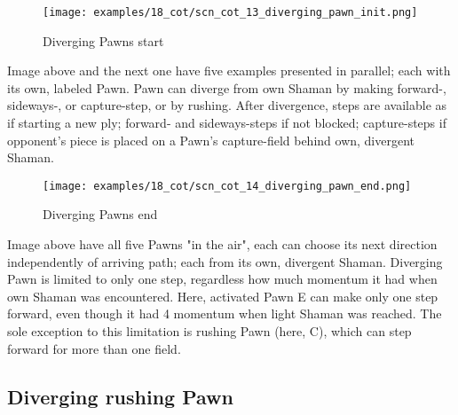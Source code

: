 \vspace*{-1.4\baselineskip}
\noindent
\begin{figure}[!h]
\texttt{[image: examples/18\_cot/scn\_cot\_13\_diverging\_pawn\_init.png]}
\vspace*{-1.3\baselineskip}
\caption{Diverging Pawns start}
\label{fig:scn_cot_13_diverging_pawn_init}
\end{figure}

\vspace*{-0.5\baselineskip}
Image above and the next one have five examples presented in parallel; each with
its own, labeled Pawn. \newline
\indent
Pawn can diverge from own Shaman by making forward-, sideways-, or capture-step,
or by rushing. After divergence, steps are available as if starting a new ply;
forward- and sideways-steps if not blocked; capture-steps if opponent's piece is
placed on a Pawn's capture-field behind own, divergent Shaman.

\clearpage %

\vspace*{-2.1\baselineskip}
\noindent
\begin{figure}[!h]
\texttt{[image: examples/18\_cot/scn\_cot\_14\_diverging\_pawn\_end.png]}
\vspace*{-1.3\baselineskip}
\caption{Diverging Pawns end}
\label{fig:scn_cot_14_diverging_pawn_end}
\end{figure}

\vspace*{-0.4\baselineskip}
Image above have all five Pawns "in the air", each can choose its next direction
independently of arriving path; each from its own, divergent Shaman. \newline
\indent
Diverging Pawn is limited to only one step, regardless how much momentum it had
when own Shaman was encountered. Here, activated Pawn E can make only one step
forward, even though it had 4 momentum when light Shaman was reached. The sole
exception to this limitation is rushing Pawn (here, C), which can step forward
for more than one field.

\clearpage %

\subsection*{Diverging rushing Pawn}
\label{sec:Conquest of Tlalocan/Divergence/Diverging rushing Pawn}

